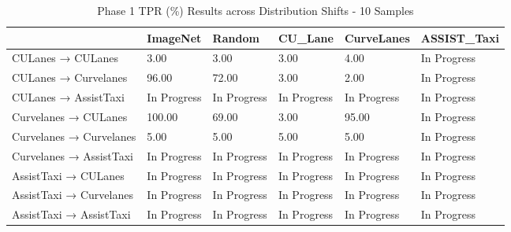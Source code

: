 \begin{table}
\caption{Phase 1 TPR (\%) Results across Distribution Shifts - 10 Samples}
\label{tab:phase1_tpr_10}
\begin{tabular}{llllll}
\toprule
 & ImageNet & Random & CU_Lane & CurveLanes & ASSIST_Taxi \\
\midrule
CULanes → CULanes & 3.00 & 3.00 & 3.00 & 4.00 & In Progress \\
CULanes → Curvelanes & 96.00 & 72.00 & 3.00 & 2.00 & In Progress \\
CULanes → AssistTaxi & In Progress & In Progress & In Progress & In Progress & In Progress \\
Curvelanes → CULanes & 100.00 & 69.00 & 3.00 & 95.00 & In Progress \\
Curvelanes → Curvelanes & 5.00 & 5.00 & 5.00 & 5.00 & In Progress \\
Curvelanes → AssistTaxi & In Progress & In Progress & In Progress & In Progress & In Progress \\
AssistTaxi → CULanes & In Progress & In Progress & In Progress & In Progress & In Progress \\
AssistTaxi → Curvelanes & In Progress & In Progress & In Progress & In Progress & In Progress \\
AssistTaxi → AssistTaxi & In Progress & In Progress & In Progress & In Progress & In Progress \\
\bottomrule
\end{tabular}
\end{table}
